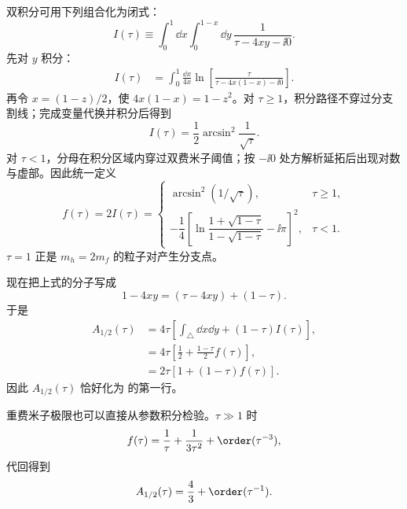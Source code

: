 \begin{derivation}
双积分可用下列组合化为闭式：
\begin{equation*}
 I(\tau)
 \equiv\int_0^1\dd x\int_0^{1-x}\dd y\,
 \frac1{\tau-4xy-\ii0}.
\end{equation*}
先对 $y$ 积分：
\begin{align*}
 I(\tau)
 &=\int_0^1\frac{\dd x}{4x}
 \ln\!\left[
 \frac{\tau}{\tau-4x(1-x)-\ii0}
 \right].
\end{align*}
再令 $x=(1-z)/2$，使 $4x(1-x)=1-z^2$。对 $\tau\ge1$，积分路径不穿过分支割线；完成变量代换并积分后得到
\begin{equation*}
 I(\tau)=\frac12\arcsin^2\!\frac1{\sqrt\tau}.
\end{equation*}
对 $\tau<1$，分母在积分区域内穿过双费米子阈值；按 $-\ii0$ 处方解析延拓后出现对数与虚部。因此统一定义
\begin{equation*}
 {
 f(\tau)=2I(\tau)=
 \begin{cases}
 \arcsin^2(1/\sqrt\tau),&\tau\ge1,\\[4pt]
 -\dfrac14\left[
 \ln\dfrac{1+\sqrt{1-\tau}}{1-\sqrt{1-\tau}}-\ii\pi
 \right]^2,&\tau<1.
 \end{cases}}
\end{equation*}
$\tau=1$ 正是 $m_h=2m_f$ 的粒子对产生分支点。

现在把上式的分子写成
\begin{equation*}
 1-4xy=(\tau-4xy)+(1-\tau).
\end{equation*}
于是
\begin{align*}
 A_{1/2}(\tau)
 &=4\tau\left[
 \int_\triangle\dd x\dd y
 +(1-\tau)I(\tau)
 \right],\\
 &=4\tau\left[\frac12+\frac{1-\tau}{2}f(\tau)\right],\\
 &={2\tau[1+(1-\tau)f(\tau)]}.
\end{align*}
因此 $A_{1/2}(\tau)$ 恰好化为 的第一行。

重费米子极限也可以直接从参数积分检验。$\tau\gg1$ 时
\begin{equation*}
 f(\tau)=\frac1\tau+\frac1{3\tau^2}+\order(\tau^{-3}),
\end{equation*}
代回得到
\begin{equation*}
 {A_{1/2}(\tau)=\frac43+\order(\tau^{-1}).}
\end{equation*}
\end{derivation}

